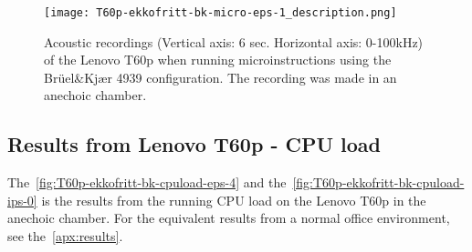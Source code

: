 \begin{figure}[ht]
    \centering
    \texttt{[image: T60p-ekkofritt-bk-micro-eps-1\_description.png]}
    \caption{Acoustic recordings (Vertical axis: 6 sec. Horizontal axis: 0-100kHz) of the Lenovo T60p when running microinstructions using the Brüel\&Kjær 4939 configuration. The recording was made in an anechoic chamber.}
    \label{fig:T60p-ekkofritt-bk-micro-eps-1}
\end{figure}


\subsection{Results from Lenovo T60p - CPU load}\label{chp5:subsec:t60p_bk_results_cpuload}
The~\autoref{fig:T60p-ekkofritt-bk-cpuload-eps-4} and the~\autoref{fig:T60p-ekkofritt-bk-cpuload-ips-0} is the results from the running CPU load on the Lenovo T60p in the anechoic chamber. For the equivalent results from a normal office environment, see the~\autoref{apx:results}.

